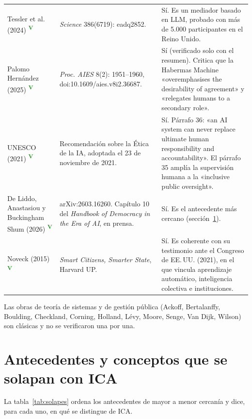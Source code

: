 \documentclass[11pt,a4paper]{article}
\newcommand{\ver}{\textsuperscript{\textcolor{ForestGreen}{\textbf{V}}}}
\begin{document}
{\begin{longtable}{P{3.0cm}P{5.4cm}P{5.8cm}}
Tessler et al. (2024) \ver &
\emph{Science} 386(6719): eadq2852. &
Sí. Es un mediador basado en LLM, probado con más de 5.000 participantes en el Reino Unido.\\
Palomo Hernández (2025) \ver &
\emph{Proc. AIES} 8(2): 1951--1960, doi:10.1609/aies.v8i2.36687. &
Sí (verificado solo con el resumen). Critica que la Habermas Machine «overemphasises the desirability of agreement» y «relegates humans to a secondary role».\\
UNESCO (2021) \ver &
Recomendación sobre la Ética de la IA, adoptada el 23 de noviembre de 2021. &
Sí. Párrafo 36: «an AI system can never replace ultimate human responsibility and accountability». El párrafo 35 amplía la supervisión humana a la «inclusive public oversight».\\
De Liddo, Anastasiou y Buckingham Shum (2026) \ver &
arXiv:2603.16260. Capítulo 10 del \emph{Handbook of Democracy in the Era of AI}, en prensa. &
Sí. Es el antecedente más cercano (sección~\ref{sec:antecedentes}).\\
Noveck (2015) \ver &
\emph{Smart Citizens, Smarter State}, Harvard UP. &
Sí. Es coherente con su testimonio ante el Congreso de EE.\,UU. (2021), en el que vincula aprendizaje automático, inteligencia colectiva e instituciones.\\
\end{longtable}
}

Las obras de teoría de sistemas y de gestión pública (Ackoff, Bertalanffy, Boulding, Checkland, Corning, Holland, Lévy, Moore, Senge, Van Dijk, Wilson) son clásicas y no se verificaron una por una.

\section{Antecedentes y conceptos que se solapan con ICA}\label{sec:antecedentes}

La tabla~\ref{tab:solapes} ordena los antecedentes de mayor a menor cercanía y dice, para cada uno, en qué se distingue de ICA.
\end{document}
